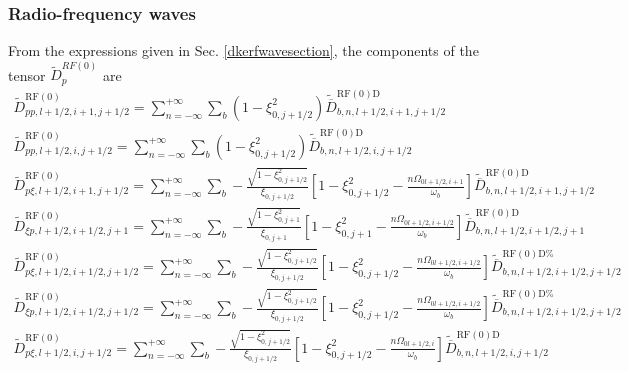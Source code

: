 \subsubsection{Radio-frequency waves}

From the expressions given in Sec. \ref{dkerfwavesection}, the
components of the tensor $\widetilde{D}_{p}^{RF\left( 0\right) }$
are
\begin{equation}
\begin{array}{l}
\widetilde{D}_{pp,l+1/2,i+1,j+1/2}^{\text{RF}\left( 0\right) }=\sum_{n=-%
\infty }^{+\infty }\sum_{b}(1-\xi _{0,j+1/2}^{2})\widetilde{\overline{D}}%
_{b,n,l+1/2,i+1,j+1/2}^{\text{RF}(0)\text{D}} \\
\widetilde{D}_{pp,l+1/2,i,j+1/2}^{\text{RF}\left( 0\right) }=\sum_{n=-\infty %
}^{+\infty }\sum_{b}(1-\xi _{0,j+1/2}^{2})\widetilde{\overline{D}}%
_{b,n,l+1/2,i,j+1/2}^{\text{RF}(0)\text{D}} \\
\widetilde{D}_{p\xi ,l+1/2,i+1,j+1/2}^{\text{RF}\left( 0\right) }=\sum_{n=-%
\infty }^{+\infty }\sum_{b}-\frac{\sqrt{1-\xi _{0,j+1/2}^{2}}}{\xi _{0,j+1/2}%
}\left[ 1-\xi _{0,j+1/2}^{2}-\frac{n\Omega _{0l+1/2,i+1}}{\omega _{b}}%
\right] \widetilde{\overline{D}}_{b,n,l+1/2,i+1,j+1/2}^{\text{RF}(0)\text{D}}
\\
\widetilde{D}_{\xi p,l+1/2,i+1/2,j+1}^{\text{RF}\left( 0\right) }=\sum_{n=-%
\infty }^{+\infty }\sum_{b}-\frac{\sqrt{1-\xi _{0,j+1}^{2}}}{\xi _{0,j+1}}%
\left[ 1-\xi _{0,j+1}^{2}-\frac{n\Omega _{0l+1/2,i+1/2}}{\omega _{b}}\right]
\widetilde{\overline{D}}_{b,n,l+1/2,i+1/2,j+1}^{\text{RF}(0)\text{D}} \\
\widetilde{D}_{p\xi ,l+1/2,i+1/2,j+1/2}^{\text{RF}\left( 0\right) }=\sum_{n=-%
\infty }^{+\infty }\sum_{b}-\frac{\sqrt{1-\xi _{0,j+1/2}^{2}}}{\xi _{0,j+1/2}%
}\left[ 1-\xi _{0,j+1/2}^{2}-\frac{n\Omega _{0l+1/2,i+1/2}}{\omega _{b}}%
\right] \widetilde{\overline{D}}_{b,n,l+1/2,i+1/2,j+1/2}^{\text{RF}(0)\text{D%
}} \\
\widetilde{D}_{\xi p,l+1/2,i+1/2,j+1/2}^{\text{RF}\left( 0\right) }=\sum_{n=-%
\infty }^{+\infty }\sum_{b}-\frac{\sqrt{1-\xi _{0,j+1/2}^{2}}}{\xi _{0,j+1/2}%
}\left[ 1-\xi _{0,j+1/2}^{2}-\frac{n\Omega _{0l+1/2,i+1/2}}{\omega _{b}}%
\right] \widetilde{\overline{D}}_{b,n,l+1/2,i+1/2,j+1/2}^{\text{RF}(0)\text{D%
}} \\
\widetilde{D}_{p\xi ,l+1/2,i,j+1/2}^{\text{RF}\left( 0\right) }=\sum_{n=-%
\infty }^{+\infty }\sum_{b}-\frac{\sqrt{1-\xi _{0,j+1/2}^{2}}}{\xi _{0,j+1/2}%
}\left[ 1-\xi _{0,j+1/2}^{2}-\frac{n\Omega _{0l+1/2,i}}{\omega _{b}}\right]
\widetilde{\overline{D}}_{b,n,l+1/2,i,j+1/2}^{\text{RF}(0)\text{D}} \\

\end{array}
\end{equation}
